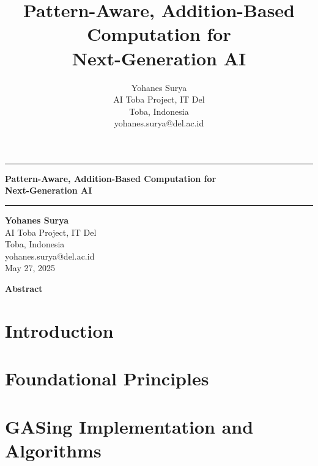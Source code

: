 \documentclass[10pt,twocolumn]{article}
\title{Pattern-Aware, Addition-Based Computation for\\Next-Generation AI}
\author{Yohanes Surya\\AI Toba Project, IT Del\\Toba, Indonesia\\yohanes.surya@del.ac.id}
\begin{document}
\pagestyle{plain}

\setlength{\columnsep}{0.5in}

\onecolumn

\begin{center}
\vspace*{-2cm}
\rule{\textwidth}{0.4pt}
\vspace{0.1cm}
{\LARGE\textbf{Pattern-Aware, Addition-Based Computation for\\Next-Generation AI}}\\
\vspace{0.5cm}
\rule{\textwidth}{0.4pt}
\vspace{0.5cm}
{\normalsize\textbf{Yohanes Surya}}\\
{\small AI Toba Project, IT Del}\\
{\small Toba, Indonesia}\\
{\small yohanes.surya@del.ac.id}\\
\vspace{0.3cm}
{\small May 27, 2025}\\
\vspace{1cm}
\end{center}

\begin{center}
{\large\textbf{Abstract}}
\end{center}
\vspace{-0.3cm}

\vspace{1cm}

\twocolumn

\section{Introduction}


\section{Foundational Principles}


\section{GASing Implementation and Algorithms}

\end{document}
